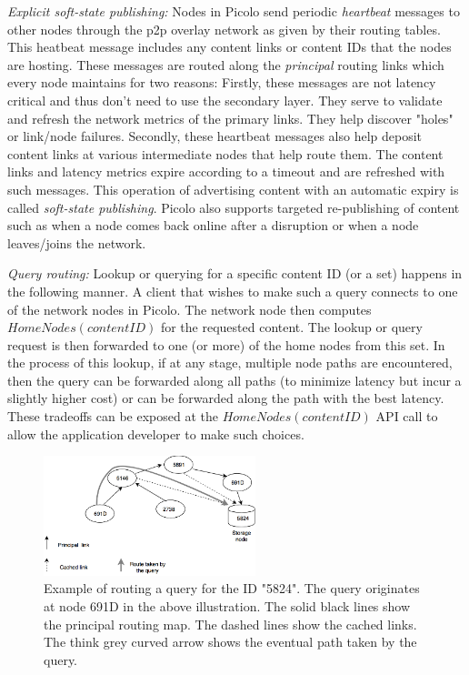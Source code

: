 {\em Explicit soft-state publishing:} Nodes in Picolo send periodic {\em heartbeat} messages to other nodes through the
p2p overlay network as given by their routing tables. This heatbeat message includes any content links or content IDs
that the nodes are hosting. These messages are routed along the {\em principal} routing links which every node maintains
for two reasons: Firstly, these messages are not latency critical and thus don't need to use the secondary layer. They
serve to validate and refresh the network metrics of the primary links. They help discover "holes" or link/node
failures. Secondly, these heartbeat messages also help deposit content links at various intermediate nodes that help
route them. The content links and latency metrics expire according to a timeout and are refreshed with such messages.
This operation of advertising content with an automatic expiry is called {\em soft-state publishing}. Picolo also
supports targeted re-publishing of content such as when a node comes back online after a disruption or when a node
leaves/joins the network.

{\em Query routing:} Lookup or querying for a specific content ID (or a set) happens in the following manner. A client
that wishes to make such a query connects to one of the network nodes in Picolo. The network node then computes
\(HomeNodes(contentID)\) for the requested content. The lookup or query request is then forwarded to one (or more)
of the home nodes from this set. In the process of this lookup, if at any stage, multiple node paths are encountered,
then the query can be forwarded along all paths (to minimize latency but incur a slightly higher cost) or can be
forwarded along the path with the best latency. These tradeoffs can be exposed at the \(HomeNodes(contentID)\) API
call to allow the application developer to make such choices.

\begin{figure}[h]
    \centering
    \includegraphics[width=0.55\textwidth]{fig/routing-eg.png}
  \caption{Example of routing a query for the ID "5824". The query originates at node 691D in the above illustration.
    The solid black lines show the principal routing map. The dashed lines show the cached links. The think grey curved
    arrow shows the eventual path taken by the query.}
    \label{fig:routing-eg}
\end{figure}

